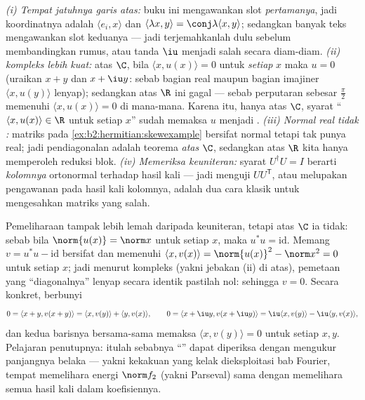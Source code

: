 \begin{remark}
\emph{(i) Tempat jatuhnya garis atas:} buku ini mengawankan slot
\emph{pertamanya}, jadi koordinatnya adalah $\langle e_i, x\rangle$
dan $\langle\lambda x, y\rangle = \conj\lambda\langle x,
y\rangle$; sedangkan banyak teks mengawankan slot keduanya ---
jadi terjemahkanlah dulu sebelum membandingkan rumus, atau tanda $\iu$
menjadi salah secara diam-diam. \emph{(ii)  kompleks lebih kuat:}
atas $\C$, bila $\langle x, u(x)\rangle = 0$ untuk \emph{setiap} $x$
maka $u = 0$ (uraikan $x + y$ dan $x + \iu y$: sebab bagian real
maupun bagian imajiner $\langle x, u(y)\rangle$ lenyap); sedangkan atas
$\R$ ini gagal --- sebab perputaran sebesar $\frac\pi2$ memenuhi
$\langle x, u(x)\rangle = 0$ di mana-mana. Karena itu, hanya atas
$\C$, syarat ``$\langle x, u(x)\rangle \in \R$ untuk setiap $x$''
sudah memaksa $u$ menjadi . \emph{(iii) Normal real tidak
:} matriks pada
\cref{ex:b2:hermitian:skewexample} bersifat normal tetapi tak punya  real; jadi pendiagonalan  adalah teorema \emph{atas}
$\C$, sedangkan atas $\R$ kita hanya memperoleh reduksi blok.
\emph{(iv) Memeriksa keuniteran:} syarat $U^\dagger U = I$ berarti
\emph{kolomnya} ortonormal terhadap hasil kali  ---
jadi menguji $UU^{\mathsf T}$, atau melupakan pengawanan pada
hasil kali kolomnya, adalah dua cara klasik untuk mengesahkan matriks
yang salah.
\end{remark}

\begin{example}\label{ex:b2:hermitian:isometry}
Pemeliharaan  tampak lebih lemah daripada keuniteran, tetapi atas $\C$
ia tidak: sebab bila $\norm{u(x)} = \norm x$ untuk setiap $x$, maka $u^*u =
\mathrm{id}$. Memang $v = u^*u - \mathrm{id}$ bersifat  dan
memenuhi $\langle x, v(x)\rangle = \norm{u(x)}^2 - \norm x^2 =
0$ untuk setiap $x$; jadi menurut  kompleks (yakni jebakan (ii)
di atas), pemetaan yang ``diagonalnya'' lenyap secara identik pastilah nol:
sehingga $v = 0$. Secara konkret,  berbunyi
\[
0 = \langle x + y, v(x+y)\rangle
= \langle x, v(y)\rangle + \langle y, v(x)\rangle,
\qquad
0 = \langle x + \iu y, v(x + \iu y)\rangle
= \iu\langle x, v(y)\rangle - \iu\langle y, v(x)\rangle ,
\]
dan kedua barisnya bersama-sama memaksa $\langle x, v(y)\rangle = 0$
untuk setiap $x, y$. Pelajaran penutupnya: itulah sebabnya ``'' dapat
diperiksa dengan mengukur panjangnya belaka --- yakni kekakuan yang kelak
dieksploitasi bab Fourier, tempat memelihara energi
$\norm f_2$ (yakni Parseval) sama dengan memelihara semua hasil kali
dalam koefisiennya.
\end{example}

